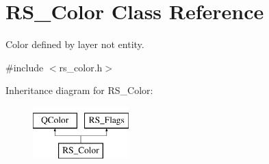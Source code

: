 \hypertarget{classRS__Color}{\section{R\-S\-\_\-\-Color Class Reference}
\label{classRS__Color}
}


Color defined by layer not entity.  




{\ttfamily \#include $<$rs\-\_\-color.\-h$>$}

Inheritance diagram for R\-S\-\_\-\-Color\-:\begin{figure}[H]
\begin{center}
\leavevmode
\includegraphics[height=2.000000cm]{classRS__Color}
\end{center}
\end{figure}

